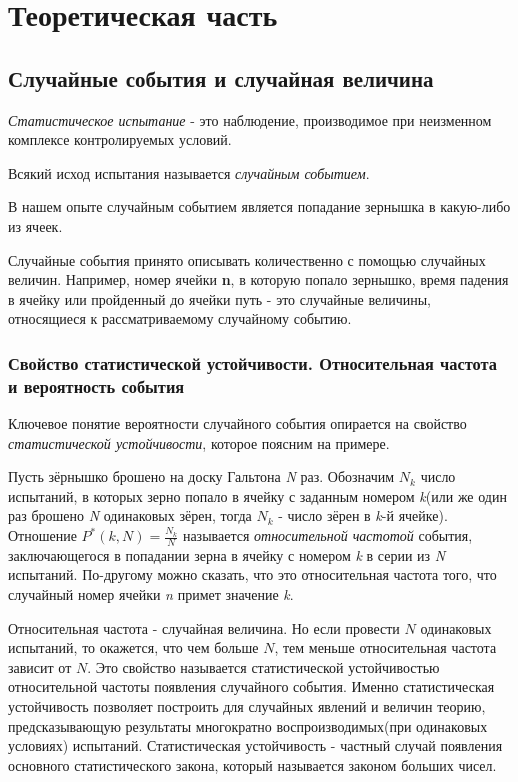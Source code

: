 \section{Теоретическая часть}
\subsection{Случайные события и случайная величина}

{\it Статистическое испытание} - это наблюдение, производимое при неизменном комплексе контролируемых условий.

Всякий исход испытания называется {\it случайным событием}. 

В нашем опыте случайным событием является попадание зернышка в какую-либо из ячеек.

Случайные события принято описывать количественно с помощью случайных величин. Например, номер ячейки \textbf{n}, в которую попало зернышко, время падения в ячейку или пройденный до ячейки путь - это случайные величины, относящиеся к рассматриваемому случайному событию.

\subsubsection{Свойство статистической устойчивости. Относительная частота и вероятность события}

Ключевое понятие вероятности случайного события опирается на свойство \textit{статистической устойчивости}, которое поясним на примере.

Пусть зёрнышко брошено на доску Гальтона \textit{N} раз. Обозначим $N_k$ число испытаний, в которых зерно попало в ячейку с заданным номером \textit{k}(или же один раз брошено \textit{N} одинаковых зёрен, тогда $N_k$ - число зёрен в \textit{k}-й ячейке). Отношение $P^*(k,N) = \frac{N_k}{N}$ называется \textit{относительной частотой} события, заключающегося в попадании зерна в ячейку с номером \textit{k} в серии из \textit{N} испытаний. По-другому можно сказать, что это относительная частота того, что случайный номер ячейки \textit{n} примет значение \textit{k}.

Относительная частота - случайная величина. Но если провести $N$ одинаковых испытаний, то окажется, что чем больше $N$, тем меньше относительная частота зависит от $N$. Это свойство называется статистической устойчивостью относительной частоты появления случайного события. Именно статистическая устойчивость позволяет построить для случайных явлений и величин теорию, предсказывающую результаты многократно воспроизводимых(при одинаковых условиях) испытаний. Статистическая устойчивость - частный случай появления основного статистического закона, который называется законом больших чисел.

